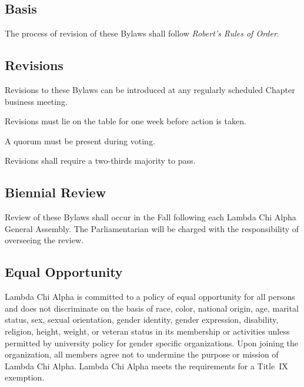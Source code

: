 \documentclass{article}
\begin{document}
\subsection{Basis}

The process of revision of these Bylaws shall follow \emph{Robert’s Rules of
Order}.

\subsection{Revisions}

\begin{subsubsectionList}
  \item Revisions to these Bylaws can be introduced at any regularly scheduled
  Chapter business meeting.

  \item Revisions must lie on the table for one week before action is taken.

  \item A quorum must be present during voting.

  \item Revisions shall require a two-thirds majority to pass.
\end{subsubsectionList}

\subsection{Biennial Review}

Review of these Bylaws shall occur in the Fall following each Lambda Chi Alpha
General Assembly. The Parliamentarian will be charged with the responsibility of
overseeing the review.

\pagebreak

\subsection{Equal Opportunity}

Lambda Chi Alpha is committed to a policy of equal opportunity for all persons
and does not discriminate on the basis of race, color, national origin, age,
marital status, sex, sexual orientation, gender identity, gender expression,
disability, religion, height, weight, or veteran status in its membership or
activities unless permitted by university policy for gender specific
organizations. Upon joining the organization, all members agree not to undermine
the purpose or mission of Lambda Chi Alpha. Lambda Chi Alpha meets the
requirements for a Title~IX exemption.
\end{document}
